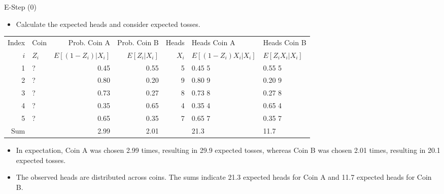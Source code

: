 \documentclass[dvipdfmx,bigger,aspectratio=169]{beamer}
\begin{document}
\begin{frame}[fragile,allowframebreaks,label=,t]{E-Step (0)}
\newpage
\begin{itemize}
\item Calculate the expected heads and consider expected tosses.
\end{itemize}
\footnotesize
\begin{center}
\begin{tabular}{r|l|rr|r|ll|}
Index & Coin & Prob. Coin A & Prob. Coin B & Heads & Heads Coin A & Heads Coin B\\
\(i\) & \(Z_{i}\) & \(E[(1-Z_{i})\vert X_{i}]\) & \(E[Z_{i}\vert X_{i}]\) & \(X_{i}\) & \(E[(1-Z_{i}) X_{i} \vert X_{i}]\) & \(E[Z_{i} X_{i} \vert X_{i}]\)\\
\hline
1 & ? & 0.45 & 0.55 & 5 & 0.45 \texttimes{} 5 & 0.55 \texttimes{} 5\\
2 & ? & 0.80 & 0.20 & 9 & 0.80 \texttimes{} 9 & 0.20 \texttimes{} 9\\
3 & ? & 0.73 & 0.27 & 8 & 0.73 \texttimes{} 8 & 0.27 \texttimes{} 8\\
4 & ? & 0.35 & 0.65 & 4 & 0.35 \texttimes{} 4 & 0.65 \texttimes{} 4\\
5 & ? & 0.65 & 0.35 & 7 & 0.65 \texttimes{} 7 & 0.35 \texttimes{} 7\\
\hline
Sum &  & 2.99 & 2.01 &  & 21.3 & 11.7\\
\end{tabular}
\end{center}
\normalsize
\begin{itemize}
\item In expectation, Coin A was chosen 2.99 times, resulting in 29.9 expected tosses, whereas Coin B was chosen 2.01 times, resulting in 20.1 expected tosses.
\item The observed heads are distributed across coins. The sums indicate 21.3 expected heads for Coin A and 11.7 expected heads for Coin B.
\end{itemize}
\end{frame}
\end{document}
